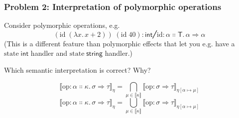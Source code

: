 \documentclass{beamer}
\newcommand{\+}{\enspace}
\newcommand{\kT}{\mathsf{T}}
\begin{document}
\begin{frame}
	\frametitle{Problem 2: Interpretation of polymorphic operations}
	Consider polymorphic operations, e.g.
	$$(\mathrm{id}\;(λx.\,x+2))\;(\mathrm{id}\;40) : \mathsf{int} ╱ \mathrm{id} : {α{∷}\kT}.\,{α⇒α}$$
	(This is a different feature than polymorphic effects that let you e.g. have a $\mathrm{state}\;\textsf{int}$ handler and $\mathrm{state}\;\textsf{string}$ handler.)

	Which semantic interpretation is correct? Why?

	\begin{equation}
		⟦\mathrm{op} : {α{∷}κ}.\,σ⇒τ⟧_η = \bigcap_{μ∈⟦κ⟧} ⟦\mathrm{op} : σ⇒τ⟧_{η[α↦μ]}
	\end{equation}
	\begin{equation}
		⟦\mathrm{op} : {α{∷}κ}.\,σ⇒τ⟧_η = \bigcup_{μ∈⟦κ⟧} ⟦\mathrm{op} : σ⇒τ⟧_{η[α↦μ]}
	\end{equation}


\end{frame}
\end{document}
